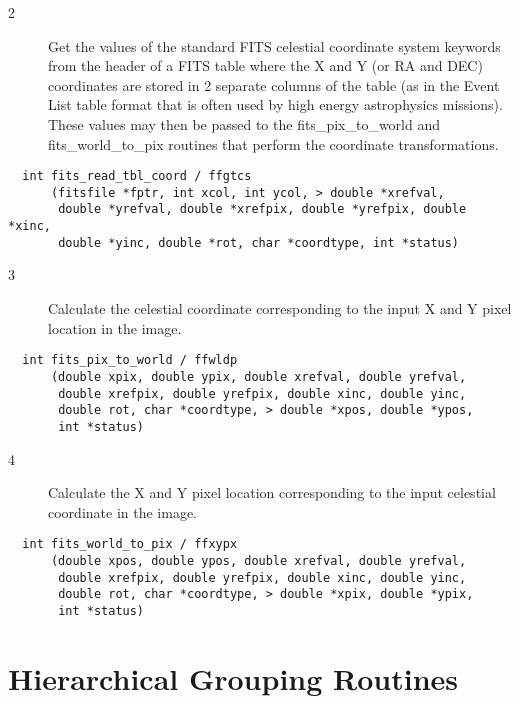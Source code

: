 \documentclass[11pt]{book}
\begin{document}
\begin{description}
\item[2 ] Get the values of the standard FITS celestial coordinate system
    keywords from the header of a FITS table where the X and Y (or RA
    and DEC) coordinates are stored in 2 separate columns of the table
    (as in the Event List table format that is often used by high energy
    astrophysics missions).  These values may then be passed to the
    fits\_pix\_to\_world and fits\_world\_to\_pix routines that perform
   the coordinate transformations. \label{ffgtcs}
\end{description}

\begin{verbatim}
  int fits_read_tbl_coord / ffgtcs
      (fitsfile *fptr, int xcol, int ycol, > double *xrefval,
       double *yrefval, double *xrefpix, double *yrefpix, double *xinc,
       double *yinc, double *rot, char *coordtype, int *status)
\end{verbatim}

\begin{description}
\item[3 ]  Calculate the celestial coordinate corresponding to the input
    X and Y pixel location in the image. \label{ffwldp}
\end{description}

\begin{verbatim}
  int fits_pix_to_world / ffwldp
      (double xpix, double ypix, double xrefval, double yrefval,
       double xrefpix, double yrefpix, double xinc, double yinc,
       double rot, char *coordtype, > double *xpos, double *ypos,
       int *status)
\end{verbatim}

\begin{description}
\item[4 ]  Calculate the X and Y pixel location corresponding to the input
    celestial coordinate in the image. \label{ffxypx}
\end{description}

\begin{verbatim}
  int fits_world_to_pix / ffxypx
      (double xpos, double ypos, double xrefval, double yrefval,
       double xrefpix, double yrefpix, double xinc, double yinc,
       double rot, char *coordtype, > double *xpix, double *ypix,
       int *status)
\end{verbatim}


\chapter{  Hierarchical Grouping Routines }
\end{document}
